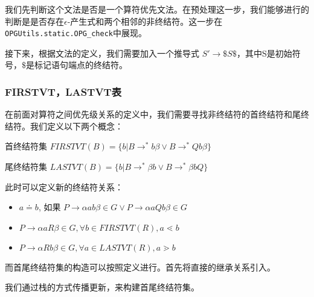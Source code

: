 我们先判断这个文法是否是一个算符优先文法。在预处理这一步，我们能够进行的判断是是否存在$\epsilon$-产生式和两个相邻的非终结符。这一步在\texttt{OPGUtils.static.OPG\_check}中展现。

接下来，根据文法的定义，我们需要加入一个推导式 $S' \rightarrow \$ S\$ $，其中S是初始符号，$\$$是标记语句端点的终结符。

\subsubsection*{FIRSTVT，LASTVT表}

在前面对算符之间优先级关系的定义中，我们需要寻找非终结符的首终结符和尾终结符。我们定义以下两个概念：

首终结符集 $FIRSTVT(B) = \{b | B\rightarrow^* b\beta \lor B \rightarrow^* Qb\beta \}$

尾终结符集 $LASTVT(B) = \{b | B\rightarrow^* \beta b \lor B \rightarrow^* \beta bQ \}$

此时可以定义新的终结符关系：

\begin{itemize}
  \item $a \doteq b$, 如果 $ P \rightarrow \alpha a b \beta \in G \lor P \rightarrow \alpha a Q b \beta \in G $
  \item $ P \rightarrow \alpha a R \beta \in G, \forall b \in FIRSTVT(R), a \lessdot b$
  \item $ P \rightarrow \alpha R b \beta \in G,\forall a \in LASTVT(R), a \gtrdot b$
\end{itemize}

而首尾终结符集的构造可以按照定义进行。首先将直接的继承关系引入。

我们通过栈的方式传播更新，来构建首尾终结符集。

